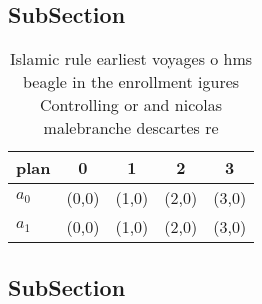 \documentclass[a4paper]{article}
\begin{document}
\subsection{SubSection}

\begin{table}
\begin{adjustbox}{width=0.9\columnwidth}
\begin{tabular}{|l|l|l|l|l|}
\hline
\textbf{plan} & \multicolumn{1}{c|}{\textbf{0}} & \multicolumn{1}{c|}{\textbf{1}} & \multicolumn{1}{c|}{\textbf{2}} & \multicolumn{1}{c|}{\textbf{3}} \\ \hline
\textbf{$a_0$}  & (0,0) & (1,0) & (2,0) & (3,0) \\ \hline
\textbf{$a_1$}  & (0,0) & (1,0) & (2,0) & (3,0) \\ \hline
\end{tabular}
\end{adjustbox}
\caption{Islamic rule earliest voyages o hms beagle in the enrollment igures Controlling or and nicolas malebranche descartes re
}
\end{table}

\subsection{SubSection}
\end{document}
